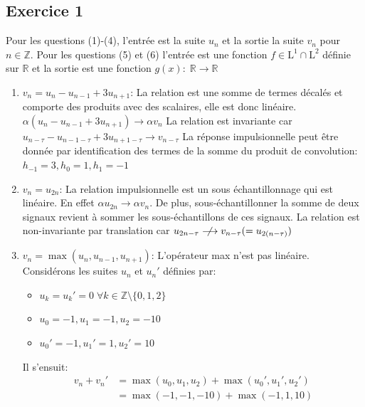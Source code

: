 \documentclass[12pt]{article}
\begin{document}
\subsection*{Exercice 1}
Pour les questions (1)-(4), l'entrée est la suite $u_n$ et la sortie la suite $v_n$ pour $n \in \mathbb{Z}$. \newline
Pour les questions (5) et (6) l'entrée est une fonction $f \in \mathrm{L}^1 \cap \mathrm{L}^2$ définie sur $\mathbb{R}$ et la sortie est une fonction $g(x): \; \mathbb{R} \rightarrow \mathbb{R}$
\begin{enumerate}
\item $v_n = u_n - u_{n-1} + 3u_{n+1}$: \newline
La relation est une somme de termes décalés et comporte des produits avec des scalaires, elle est donc linéaire. $\alpha(u_n - u_{n-1} + 3u_{n+1}) \rightarrow \alpha v_n$ \newline
La relation est invariante car $u_{n-\tau} - u_{n-1-\tau} + 3u_{n+1-\tau} \rightarrow v_{n-\tau}$ \newline
La réponse impulsionnelle peut être donnée par identification des termes de la somme du produit de convolution: $h_{-1} = 3, h_0 = 1, h_1 = -1$
\item $v_n = u_{2n}$: \newline
La relation impulsionnelle est un sous échantillonnage qui est linéaire. En effet $\alpha u_{2n} \rightarrow \alpha v_n$. De plus, sous-échantillonner la somme de deux signaux revient à sommer les sous-échantillons de ces signaux.
La relation est non-invariante par translation car $u_{2n-\tau} \centernot\longrightarrow v_{n-\tau} (=u_{2(n-\tau)})$
\item $v_n = \max(u_n, u_{n-1}, u_{n+1})$: \newline
L'opérateur max n'est pas linéaire. Considérons les suites $u_n$ et $u_n'$ définies par: \newline
\begin{itemize}
\item $u_k = u_k' = 0 \;\forall k \in \mathbb{Z} \setminus \{0, 1, 2\}$
\item $u_0 = -1, u_1 = -1, u_2 = -10 $
\item $u_0' = -1, u_1' = 1, u_2' = 10 $
\end{itemize}
Il s'ensuit: 
\begin{equation*}
\begin{split}
 v_n + v_n' &= \max(u_0, u_1, u_2) + \max(u_0', u_1', u_2') \\
			&= \max(-1, -1, -10) + \max(-1, 1, 10) \\

\end{split}
\end{equation*}
\end{enumerate}
\end{document}
